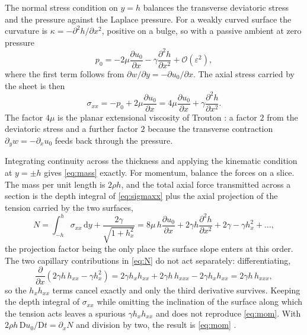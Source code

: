 \documentclass[11pt,a4paper]{article}
\begin{document}
The normal stress condition on $y = h$ balances the transverse deviatoric
stress and the pressure against the Laplace pressure. For a weakly curved
surface the curvature is $\kappa = -\partial^{2}h/\partial x^{2}$, positive on a
bulge, so with a passive ambient at zero pressure
%
\begin{equation}
  p_{0} = -2\mu \frac{\partial u_{0}}{\partial x}
          - \gamma \frac{\partial^{2} h}{\partial x^{2}}
          + \mathcal{O}(\varepsilon^{2}),
\end{equation}
%
where the first term follows from $\partial w/\partial y = -\partial u_{0}/\partial x$.
The axial stress carried by the sheet is then
%
\begin{equation}
  \sigma_{xx} = -p_{0} + 2\mu \frac{\partial u_{0}}{\partial x}
  = 4\mu \frac{\partial u_{0}}{\partial x}
    + \gamma \frac{\partial^{2} h}{\partial x^{2}} .
  \label{eq:sigmaxx}
\end{equation}
%
The factor $4\mu$ is the planar extensional viscosity of Trouton
\cite{trouton1906}: a factor $2$ from the deviatoric stress and a further
factor $2$ because the transverse contraction $\partial_{y}w = -\partial_{x}u_{0}$
feeds back through the pressure.

Integrating continuity across the thickness and applying the kinematic
condition at $y = \pm h$ gives \eqref{eq:mass} exactly. For momentum, balance
the forces on a slice. The mass per unit length is $2\rho h$, and the total
axial force transmitted across a section is the depth integral of
\eqref{eq:sigmaxx} plus the axial projection of the tension carried by the two
surfaces,
%
\begin{equation}
  N = \int_{-h}^{h}\!\sigma_{xx}\,\mathrm{d}y
      + \frac{2\gamma}{\sqrt{1 + h_{x}^{2}}}
    = 8\mu\, h \frac{\partial u_{0}}{\partial x}
      + 2\gamma h \frac{\partial^{2} h}{\partial x^{2}}
      + 2\gamma - \gamma h_{x}^{2} + \dots,
  \label{eq:N}
\end{equation}
%
the projection factor being the only place the surface slope enters at this
order. The two capillary contributions in \eqref{eq:N} do not act separately:
differentiating,
%
\begin{equation}
  \frac{\partial}{\partial x}\left( 2\gamma h\, h_{xx} - \gamma h_{x}^{2}\right)
  = 2\gamma h_{x} h_{xx} + 2\gamma h\, h_{xxx} - 2\gamma h_{x} h_{xx}
  = 2\gamma h\, h_{xxx},
\end{equation}
%
so the $h_{x}h_{xx}$ terms cancel exactly and only the third derivative
survives. Keeping the depth integral of $\sigma_{xx}$ while omitting the
inclination of the surface along which the tension acts leaves a spurious
$\gamma h_{x}h_{xx}$ and does not reproduce \eqref{eq:mom}. With $2\rho h\,\mathrm{D}u_{0}/\mathrm{D}t = \partial_{x} N$
and division by two, the result is \eqref{eq:mom} \cite{erneux1993,howell1996}.
\end{document}
